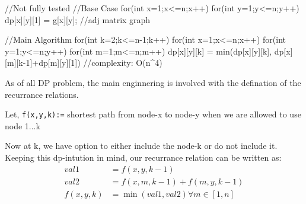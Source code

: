 \begin{code3}[code]
    //Not fully tested
    //Base Case
    for(int x=1;x<=n;x++)
    {
        for(int y=1;y<=n;y++)
        {
            dp[x][y][1] = g[x][y]; //adj matrix graph
        }
    }
    
    //Main Algorithm
    for(int k=2;k<=n-1;k++)
    {
        for(int x=1;x<=n;x++)
        {
            for(int y=1;y<=n;y++)
            {
                for(int m=1;m<=n;m++)
                {
                    dp[x][y][k] = 
                    min(dp[x][y][k], dp[x][m][k-1]+dp[m][y][1])
                }
            }
        }
    }
    //complexity: O(n^4)
\end{code3}

As of all DP problem, the main enginnering is involved with the defination of the recurrance relations.

Let, \verb|f(x,y,k):=| shortest path from node-x to node-y when we are allowed to use node 1...k

Now at k, we have option to either include the node-k or do not include it. Keeping this dp-intution in mind, our recurrance relation can be written as:
\begin{align}
    val1 &= f(x,y,k-1)\\
    val2 &= f(x,m,k-1) + f(m,y,k-1)\\
    f(x,y,k) &=  \min(val1,val2) \forall m\in[1,n]
\end{align}

